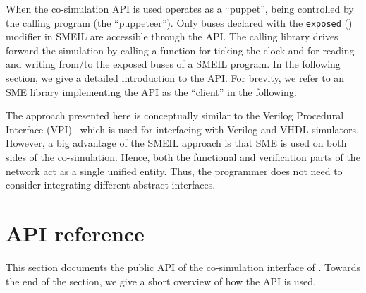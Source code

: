 When the co-simulation API is used \libsme{} operates as a ``puppet'', being
controlled by the calling program (the ``puppeteer''). Only buses declared with
the \texttt{exposed} () modifier in SMEIL are accessible
through the \libsme{} API. The calling library drives forward the simulation by
calling a function for ticking the clock and for reading and writing from/to the
exposed buses of a SMEIL program. In the following section, we give a detailed
introduction to the API.  For brevity, we refer to an SME library implementing
the API as the ``client'' in the following.






The approach presented here is conceptually similar to the Verilog Procedural
Interface (VPI)~\cite{dawson1996verilog} which is used for interfacing with
Verilog and VHDL simulators. However, a big advantage of the SMEIL approach is
that SME is used on both sides of the co-simulation. Hence, both the functional
and verification parts of the network act as a single unified entity. Thus, the
programmer does not need to consider integrating different abstract interfaces.


\section{API reference}
This section documents the public API of the co-simulation interface of
\libsme{}. Towards the end of the section, we give a short overview of how the
API is used.

